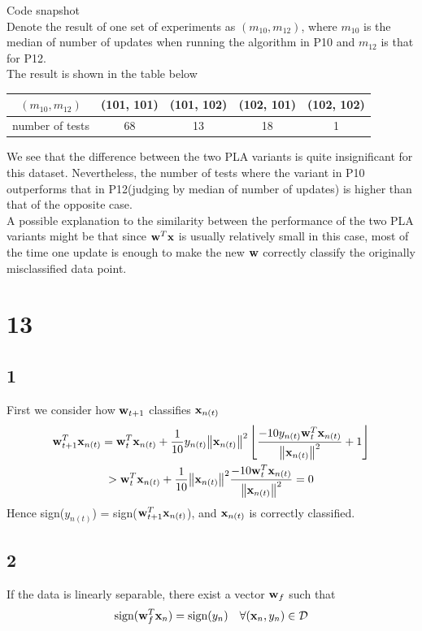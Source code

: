 \documentclass[11pt]{article}
\theoremstyle{definition}
\begin{document}
Code snapshot\\ 
Denote the result of one set of experiments as $(m_{10}, m_{12})$, where $m_{10}$ is the median of number of updates when running the algorithm in P10 and $m_{12}$ is that for P12. \\
The result is shown in the table below
\begin{center}
  \begin{tabular}{|c|c|c|c|c|}
    \hline 
    $(m_{10}, m_{12})$ & (101, 101) & (101, 102) & (102, 101) & (102, 102) \\ 
    \hline
    number of tests & 68 & 13 & 18 & 1\\
    \hline
  \end{tabular}
\end{center}
We see that the difference between the two PLA variants is quite insignificant for this dataset. Nevertheless, the number of tests where the variant in P10 outperforms that in P12(judging by median of number of updates) is higher than that of the opposite case. \\
A possible explanation to the similarity between the performance of the two PLA variants might be that since $\vb{w}^T\vb{x}$ is usually relatively small in this case, most of the time one update is enough to make the new $\vb{w}$ correctly classify the originally misclassified data point.
\newpage
\section*{13}
\subsection*{1}
First we consider how $\vb{w}_{t+1}$ classifies $\vb{x}_{n(t)}$ 
\begin{gather*}
  \vb{w}^T_{t+1}\vb{x}_{n(t)} = \vb{w}_t^T\vb{x}_{n(t)} + \frac{1}{10}y_{n(t)}\norm{\vb{x}_{n(t)}}^2\left\lfloor\frac{-10y_{n(t)}\vb{w}_t^T\vb{x}_{n(t)}}{\norm{\vb{x}_{n(t)}}^2} + 1\right\rfloor \\ 
   > \vb{w}_t^T\vb{x}_{n(t)} + \frac{1}{10}\norm{\vb{x}_{n(t)}}^2\frac{-10\vb{w}_t^T\vb{x}_{n(t)}}{\norm{\vb{x}_{n(t)}}^2} = 0
\end{gather*}
Hence sign($y_{n(t)}$) = sign($\vb{w}_{t+1}^T\vb{x}_{n(t)}$), and $\vb{x}_{n(t)}$ is correctly classified.  \\ 
\subsection*{2}
If the data is linearly separable, there exist a vector $\vb{w}_f$ such that 
\[
  \text{sign}(\vb{w}_f^T\vb{x}_n) = \text{sign}(y_n) \quad \forall (\vb{x}_n, y_n) \in \mathcal{D}
\]
\end{document}
